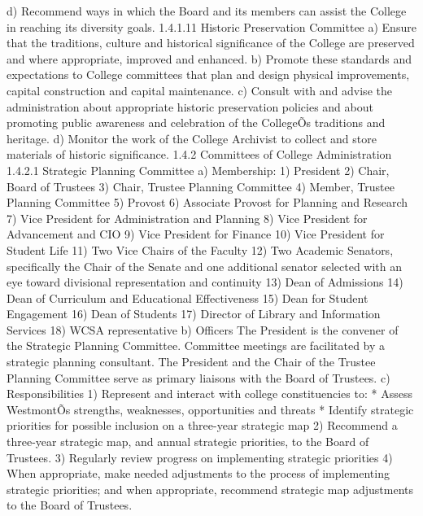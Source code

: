 \documentclass[letterpaper, 11pt]{article}
\begin{document}
			d) Recommend ways in which the Board and its members can assist the College in reaching its diversity goals.
			1.4.1.11 Historic Preservation Committee
			a) Ensure that the traditions, culture and historical significance of the College are preserved and where appropriate, improved and enhanced.
			b) Promote these standards and expectations to College committees that plan and design physical improvements, capital construction and capital maintenance.
			c) Consult with and advise the administration about appropriate historic preservation policies and about promoting public awareness and celebration of the CollegeÕs traditions and heritage.
			d) Monitor the work of the College Archivist to collect and store materials of historic significance.
			1.4.2 Committees of College Administration
			1.4.2.1 Strategic Planning Committee
			a)	Membership:
			1) President
			2) Chair, Board of Trustees
			3) Chair, Trustee Planning Committee
			4) Member, Trustee Planning Committee
			5) Provost
			6) Associate Provost for Planning and Research
			7) Vice President for Administration and Planning
			8) Vice President for Advancement and CIO
			9) Vice President for Finance
			10) Vice President for Student Life
			11) Two Vice Chairs of the Faculty
			12) Two Academic Senators, specifically the Chair of the Senate and one additional senator selected with an eye toward divisional representation and continuity
			13) Dean of Admissions
			14) Dean of Curriculum and Educational Effectiveness
			15) Dean for Student Engagement
			16) Dean of Students
			17) Director of Library and Information Services
			18) WCSA representative
			b)  Officers
			The President is the convener of the Strategic Planning Committee.  Committee meetings are facilitated by a strategic planning consultant.  The President and the Chair of the Trustee Planning Committee serve as primary liaisons with the Board of Trustees.
			c) Responsibilities
			1) Represent and interact with college constituencies to:
			* Assess WestmontÕs strengths, weaknesses, opportunities and threats
			* Identify strategic priorities for possible inclusion on a three-year strategic map
			2) Recommend a three-year strategic map, and annual strategic priorities, to the Board of Trustees.
			3) Regularly review progress on implementing strategic priorities
			4) When appropriate, make needed adjustments to the process of implementing strategic priorities; and when appropriate, recommend strategic map adjustments to the Board of Trustees.
\end{document}
